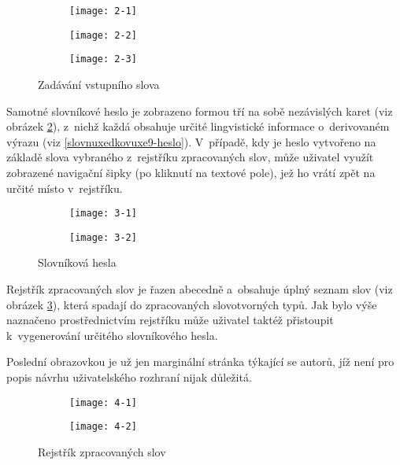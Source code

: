 \begin{figure}[ht]
  \begin{subfigure}[b]{0.3\textwidth}
    \texttt{[image: 2-1]}
  \end{subfigure}
  \hfill
  \begin{subfigure}[b]{0.3\textwidth}
    \texttt{[image: 2-2]}
  \end{subfigure}
   \hfill
  \begin{subfigure}[b]{0.3\textwidth}
   \texttt{[image: 2-3]}
  \end{subfigure}
  \caption{Zadávání vstupního slova}
  \label{2}
\end{figure}

Samotné slovníkové heslo je zobrazeno formou tří na sobě nezávislých
karet (viz obrázek \ref{3}), z~nichž každá obsahuje určité lingvistické
informace o~derivovaném výrazu (viz \ref{slovnuxedkovuxe9-heslo}).
V~případě, kdy je heslo vytvořeno na základě slova vybraného z~rejstříku
zpracovaných slov, může uživatel využít zobrazené navigační šipky (po
kliknutí na textové pole), jež ho vrátí zpět na určité místo
v~rejstříku.

\begin{figure}[ht]
  \begin{subfigure}[b]{0.45\textwidth}
    \texttt{[image: 3-1]}
  \end{subfigure}
  \hfill
  \begin{subfigure}[b]{0.45\textwidth}
    \texttt{[image: 3-2]}
  \end{subfigure}
  \caption{Slovníková hesla}
  \label{3}
\end{figure}

Rejstřík zpracovaných slov je řazen abecedně a~obsahuje úplný seznam
slov (viz obrázek \ref{4}), která spadají do zpracovaných slovotvorných
typů. Jak bylo výše naznačeno prostřednictvím rejstříku může uživatel
taktéž přistoupit k~vygenerování určitého slovníkového hesla.

Poslední obrazovkou je už jen marginální stránka týkající se autorů, jíž
není pro popis návrhu uživatelského rozhraní nijak důležitá.

\begin{figure}[ht]
  \begin{subfigure}[b]{0.45\textwidth}
    \texttt{[image: 4-1]}
  \end{subfigure}
  \hfill
  \begin{subfigure}[b]{0.45\textwidth}
    \texttt{[image: 4-2]}
  \end{subfigure}
  \caption{Rejstřík zpracovaných slov}
  \label{4}
\end{figure}


